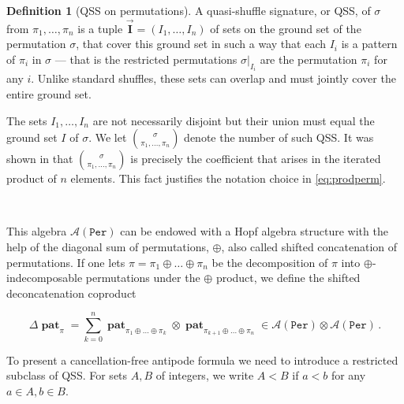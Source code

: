 \documentclass[12pt, reqno]{amsart}
\theoremstyle{definition}
\newtheorem{defin}[thm]{Definition}
\newcommand{\III}{\vec{\mathbf{I}}}
\DeclareMathOperator{\pat}{\mathbf{pat}}
\begin{document}
\begin{defin}[QSS on permutations]
A quasi-shuffle signature, or QSS, of $\sigma$ from $\pi_1, \dots, \pi_n$ is a tuple $\III = (I_1, \dots, I_n)$ of sets on the ground set of the permutation $\sigma$, that cover this ground set in such a way that each $I_i$ is a pattern of $\pi_i$ in $\sigma$ --- that is the restricted permutations $\sigma|_{I_i}$ are the permutation $\pi_i$ for any $i$. Unlike standard shuffles, these sets can overlap and must jointly cover the entire ground set.

The sets $I_1, \ldots, I_n$ are not necessarily disjoint but their union must equal the ground set $I$ of $\sigma$.
We let $\binom{\sigma}{\pi_1, \dots, \pi_n}$ denote the number of such QSS.
It was shown in \cite{Penaguiao2020} that $\binom{\sigma}{\pi_1, \dots, \pi_n}$ is precisely the coefficient that arises in the iterated product of $n$ elements.
This fact justifies the notation choice in \eqref{eq:prodperm}.

\end{defin}

\

This algebra $\mathcal A(\mathtt{Per})$ can be endowed with a Hopf algebra structure with the help of the diagonal sum of permutations, $\oplus$, also called shifted concatenation of permutations.
If one lets $\pi = \pi_1 \oplus \dots \oplus \pi_n$ be the decomposition of $\pi$ into $\oplus$-indecomposable permutations under the $\oplus$ product, we define the shifted deconcatenation coproduct

\begin{equation}\label{eq:coprodperm}
\Delta \pat_{\pi} = \sum_{k=0}^n \pat_{\pi_1\oplus \dots \oplus \pi_k} \otimes \pat_{\pi_{k+1}\oplus \dots \oplus \pi_n} \in \mathcal A (\mathtt{Per}) \otimes \mathcal A (\mathtt{Per})\, .
\end{equation}

To present a cancellation-free antipode formula we need to introduce a restricted subclass of QSS.
For sets $A, B$ of integers, we write $A <B$ if $a<b $ for any $a\in A, b \in B$.
\end{document}
